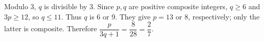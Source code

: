 Modulo 3, $q$ is divisible by 3. Since $p,q$ are positive composite integers, $q\ge6$ and $3p\ge12$, so $q\le11$. Thus $q$ is 6 or 9. They give $p=13$ or 8, respectively; only the latter is composite. Therefore $\dfrac{p}{3q+1}=\dfrac{8}{28}=\boxed{\dfrac{2}{7}}$.
